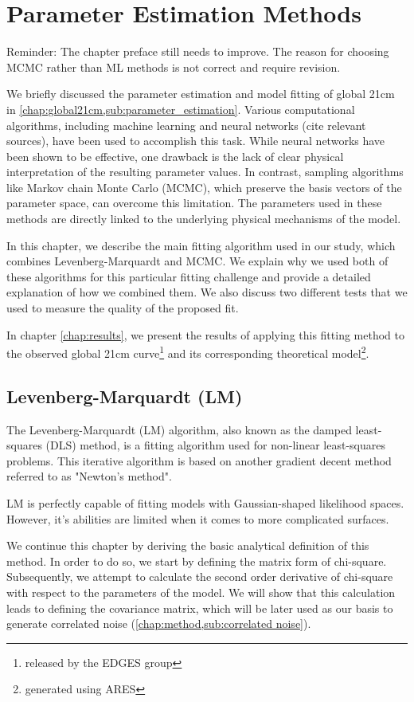 \documentclass[12pt, TexShade, letterpaper]{report}
\begin{document}
\chapter{Parameter Estimation Methods}
\label{chap:method}
Reminder: The chapter preface still needs to improve. The reason for choosing MCMC rather than ML methods is not correct and require revision. \par
We briefly discussed the parameter estimation and model fitting of global 21cm in \ref{chap:global21cm,sub:parameter_estimation}. Various computational algorithms, including machine learning and neural networks (cite relevant sources), have been used to accomplish this task. While neural networks have been shown to be effective, one drawback is the lack of clear physical interpretation of the resulting parameter values. In contrast, sampling algorithms like Markov chain Monte Carlo (MCMC), which preserve the basis vectors of the parameter space, can overcome this limitation. The parameters used in these methods are directly linked to the underlying physical mechanisms of the model.\par
In this chapter, we describe the main fitting algorithm used in our study, which combines Levenberg-Marquardt and MCMC. We explain why we used both of these algorithms for this particular fitting challenge and provide a detailed explanation of how we combined them. We also discuss two different tests that we used to measure the quality of the proposed fit.\par
In chapter \ref{chap:results}, we present the results of applying this fitting method to the observed global 21cm curve\footnote{released by the EDGES group} and its corresponding theoretical model\footnote{generated using ARES}.
\section{Levenberg-Marquardt (LM)}
\label{chap:method,sub:LM}
The Levenberg-Marquardt (LM) algorithm, also known as the damped least-squares (DLS) method, is a fitting algorithm used for non-linear least-squares problems. This iterative algorithm is based on another gradient decent method referred to as "Newton's method".\par
LM is perfectly capable of fitting models with Gaussian-shaped likelihood spaces. However, it's abilities are limited when it comes to more complicated surfaces.\par
We continue this chapter by deriving the basic analytical definition of this method. In order to do so, we start by defining the matrix form of chi-square. Subsequently, we attempt to calculate the second order derivative of chi-square with respect to the parameters of the model. We will show that this calculation leads to defining the covariance matrix, which will be later used as our basis to generate correlated noise (\ref{chap:method,sub:correlated noise}).\par
\end{document}
